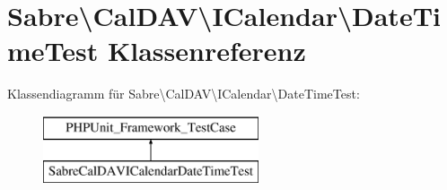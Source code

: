 \hypertarget{class_sabre_1_1_v_object_1_1_property_1_1_i_calendar_1_1_date_time_test}{}\section{Sabre\textbackslash{}Cal\+D\+AV\textbackslash{}I\+Calendar\textbackslash{}Date\+Time\+Test Klassenreferenz}
\label{class_sabre_1_1_v_object_1_1_property_1_1_i_calendar_1_1_date_time_test}
Klassendiagramm für Sabre\textbackslash{}Cal\+D\+AV\textbackslash{}I\+Calendar\textbackslash{}Date\+Time\+Test\+:\begin{figure}[H]
\begin{center}
\leavevmode
\includegraphics[height=2.000000cm]{class_sabre_1_1_v_object_1_1_property_1_1_i_calendar_1_1_date_time_test}
\end{center}
\end{figure}
